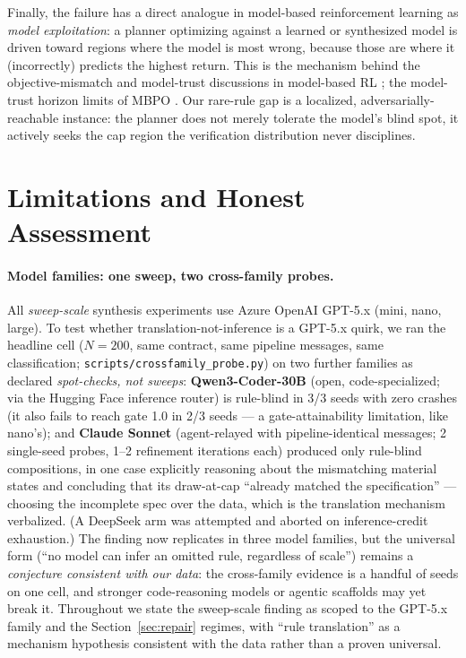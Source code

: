 \documentclass[11pt]{article}
\theoremstyle{remark}
\begin{document}
Finally, the failure has a direct analogue in model-based reinforcement learning as \emph{model exploitation}: a planner optimizing against a learned or synthesized model is driven toward regions where the model is most wrong, because those are where it (incorrectly) predicts the highest return. This is the mechanism behind the objective-mismatch and model-trust discussions in model-based RL \citep{lambert2020objective}; the model-trust horizon limits of MBPO \citep{janner2019mbpo}. Our rare-rule gap is a localized, adversarially-reachable instance: the planner does not merely tolerate the model's blind spot, it actively seeks the cap region the verification distribution never disciplines.

\section{Limitations and Honest Assessment}
\label{sec:limitations}

\paragraph{Model families: one sweep, two cross-family probes.} All \emph{sweep-scale} synthesis experiments use Azure OpenAI GPT-5.x (mini, nano, large). To test whether translation-not-inference is a GPT-5.x quirk, we ran the headline cell ($N=200$, same contract, same pipeline messages, same classification; \texttt{scripts/crossfamily\_probe.py}) on two further families as declared \emph{spot-checks, not sweeps}: \textbf{Qwen3-Coder-30B} (open, code-specialized; via the Hugging Face inference router) is rule-blind in 3/3 seeds with zero crashes (it also fails to reach gate 1.0 in 2/3 seeds --- a gate-attainability limitation, like nano's); and \textbf{Claude Sonnet} (agent-relayed with pipeline-identical messages; 2 single-seed probes, 1--2 refinement iterations each) produced only rule-blind compositions, in one case explicitly reasoning about the mismatching material states and concluding that its draw-at-cap ``already matched the specification'' --- choosing the incomplete spec over the data, which is the translation mechanism verbalized. (A DeepSeek arm was attempted and aborted on inference-credit exhaustion.) The finding now replicates in three model families, but the universal form (``no model can infer an omitted rule, regardless of scale'') remains a \emph{conjecture consistent with our data}: the cross-family evidence is a handful of seeds on one cell, and stronger code-reasoning models or agentic scaffolds may yet break it. Throughout we state the sweep-scale finding as scoped to the GPT-5.x family and the Section~\ref{sec:repair} regimes, with ``rule translation'' as a mechanism hypothesis consistent with the data rather than a proven universal.
\end{document}
